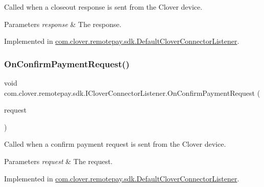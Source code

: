 Called when a closeout response is sent from the Clover device. 


\begin{DoxyParams}{Parameters}
{\em response} & The response.\\
\hline
\end{DoxyParams}


Implemented in \hyperlink{classcom_1_1clover_1_1remotepay_1_1sdk_1_1_default_clover_connector_listener_ae5a9a85a4807b9823869577a1d58d953}{com.\+clover.\+remotepay.\+sdk.\+Default\+Clover\+Connector\+Listener}.

\mbox{\label{interfacecom_1_1clover_1_1remotepay_1_1sdk_1_1_i_clover_connector_listener_a2295110c07af954e141ee82acde10e8a}} 
\subsubsection{\texorpdfstring{On\+Confirm\+Payment\+Request()}{OnConfirmPaymentRequest()}}
{\footnotesize\ttfamily void com.\+clover.\+remotepay.\+sdk.\+I\+Clover\+Connector\+Listener.\+On\+Confirm\+Payment\+Request (\begin{DoxyParamCaption}\item[{\hyperlink{classcom_1_1clover_1_1remotepay_1_1sdk_1_1_confirm_payment_request}{Confirm\+Payment\+Request}}]{request }\end{DoxyParamCaption})}



Called when a confirm payment request is sent from the Clover device. 


\begin{DoxyParams}{Parameters}
{\em request} & The request.\\
\hline
\end{DoxyParams}


Implemented in \hyperlink{classcom_1_1clover_1_1remotepay_1_1sdk_1_1_default_clover_connector_listener_ae3a107836a054cedfac615a5fbe72469}{com.\+clover.\+remotepay.\+sdk.\+Default\+Clover\+Connector\+Listener}.

